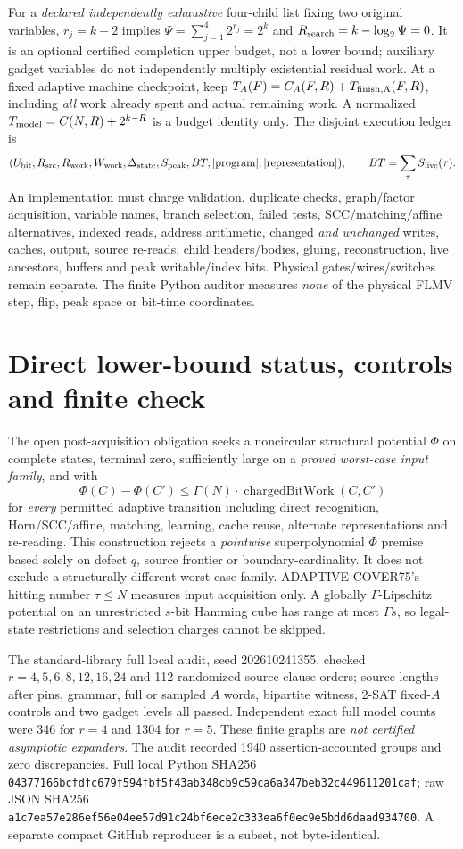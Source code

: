 \documentclass[11pt]{article}
\begin{document}
For a \emph{declared independently exhaustive} four-child list fixing two original variables, $r_j=k-2$ implies $\Psi=\sum_{j=1}^4 2^{r_j}=2^k$ and $R_{\rm search}=k-\log_2\Psi=0$. It is an optional certified completion upper budget, not a lower bound; auxiliary gadget variables do not independently multiply existential residual work. At a fixed adaptive machine checkpoint, keep $T_A(F)=C_A(F,R)+T_{\rm finish,A}(F,R)$, including \emph{all} work already spent and actual remaining work. A normalized $T_{\rm model}=C(N,R)+2^{k-R}$ is a budget identity only. The disjoint execution ledger is
\[
(U_{\rm bit},R_{\rm src},R_{\rm work},W_{\rm work},
\Delta_{\rm state},S_{\rm peak},BT,
|\mathrm{program}|,|\mathrm{representation}|),
\qquad BT=\sum_\tau S_{\rm live}(\tau).
\]
An implementation must charge validation, duplicate checks, graph/factor acquisition, variable names, branch selection, failed tests, SCC/matching/affine alternatives, indexed reads, address arithmetic, changed \emph{and unchanged} writes, caches, output, source re-reads, child headers/bodies, gluing, reconstruction, live ancestors, buffers and peak writable/index bits. Physical gates/wires/switches remain separate. The finite Python auditor measures \emph{none} of the physical FLMV step, flip, peak space or bit-time coordinates.

\section{Direct lower-bound status, controls and finite check}
The open post-acquisition obligation seeks a noncircular structural potential $\Phi$ on complete states, terminal zero, sufficiently large on a \emph{proved worst-case input family}, and with
\[
\Phi(C)-\Phi(C')\le\Gamma(N)\cdot\operatorname{chargedBitWork}(C,C')
\]
for \emph{every} permitted adaptive transition including direct recognition, Horn/SCC/affine, matching, learning, cache reuse, alternate representations and re-reading. This construction rejects a \emph{pointwise} superpolynomial $\Phi$ premise based solely on defect $q$, source frontier or boundary-cardinality. It does not exclude a structurally different worst-case family. ADAPTIVE-COVER75's hitting number $\tau\le N$ measures input acquisition only. A globally $\Gamma$-Lipschitz potential on an unrestricted $s$-bit Hamming cube has range at most $\Gamma s$, so legal-state restrictions and selection charges cannot be skipped.

The standard-library full local audit, seed 202610241355, checked $r=4,5,6,8,12,16,24$ and 112 randomized source clause orders; source lengths after pins, grammar, full or sampled $A$ words, bipartite witness, 2-SAT fixed-$A$ controls and two gadget levels all passed. Independent exact full model counts were 346 for $r=4$ and 1304 for $r=5$. These finite graphs are \emph{not certified asymptotic expanders}. The audit recorded 1940 assertion-accounted groups and zero discrepancies. Full local Python SHA256 \texttt{04377166bcfdfc679f594fbf5f43ab348cb9c59ca6a347beb32c449611201caf}; raw JSON SHA256 \texttt{a1c7ea57e286ef56e04ee57d91c24bf6ece2c333ea6f0ec9e5bdd6daad934700}. A separate compact GitHub reproducer is a subset, not byte-identical.
\end{document}
